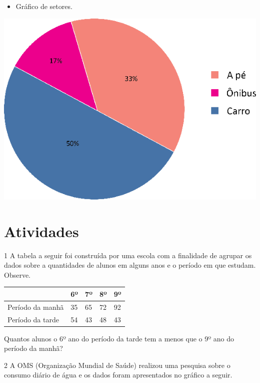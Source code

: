 {\pagebreak
\begin{itemize}
\item
  Gráfico de setores.
\end{itemize}

\includegraphics[width=\textwidth]{media/image41.png}
}

\section{Atividades}

\num{1} A tabela a seguir foi construída por uma escola com a finalidade de agrupar os
dados sobre a quantidades de alunos em alguns anos e o período em que
estudam. Observe.

\begin{longtable}[]{@{}lllll@{}}
\toprule
& 6º & 7º & 8º & 9º\tabularnewline
\midrule
\endhead
Período da manhã & 35 & 65 & 72 & 92\tabularnewline
Período da tarde & 54 & 43 & 48 & 43\tabularnewline
\bottomrule
\end{longtable}

\pagebreak
Quantos alunos o 6º ano do período da tarde tem a menos que o 9º
ano do período da manhã?

\begin{mdframed}[linewidth=2pt,linecolor=salmao,roundcorner=2pt]
\vspace{2cm}
\end{mdframed}

\num{2} A OMS (Organização Mundial de Saúde) realizou uma pesquisa sobre o
consumo diário de água e os dados foram apresentados no gráfico a seguir.

